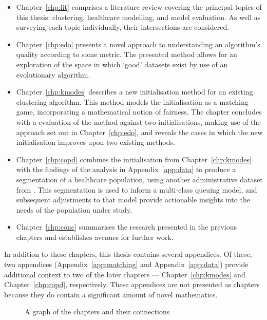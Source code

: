 \begin{itemize}
    \item Chapter~\ref{chp:lit} comprises a literature review covering the
        principal topics of this thesis: clustering, healthcare modelling, and
        model evaluation. As well as surveying each topic individually, their
        intersections are considered.
    \item Chapter~\ref{chp:edo} presents a novel approach to understanding an
        algorithm's quality according to some metric. The presented method
        allows for an exploration of the space in which `good' datasets exist
        by use of an evolutionary algorithm.
    \item Chapter~\ref{chp:kmodes} describes a new initialisation method for an
        existing clustering algorithm. This method models the initialisation as
        a matching game, incorporating a mathematical notion of fairness. The
        chapter concludes with a evaluation of the method against two
        initialisations, making use of the approach set out in
        Chapter~\ref{chp:edo}, and reveals the cases in which the new
        initialisation improves upon two existing methods.
    \item Chapter~\ref{chp:copd} combines the initialisation from
        Chapter~\ref{chp:kmodes} with the findings of the analysis in
        Appendix~\ref{app:data} to produce a segmentation of a healthcare
        population, using another administrative dataset from \ctmuhb. This
        segmentation is used to inform a multi-class queuing model, and
        subsequent adjustments to that model provide actionable insights into
        the needs of the population under study.
    \item Chapter~\ref{chp:conc} summarises the research presented in the
        previous chapters and establishes avenues for further work.
\end{itemize}

In addition to these chapters, this thesis contains several appendices. Of
these, two appendices (Appendix~\ref{app:matching} and Appendix~\ref{app:data})
provide additional context to two of the later chapters ---
Chapter~\ref{chp:kmodes} and Chapter~\ref{chp:copd}, respectively. These
appendices are not presented as chapters because they do contain a significant
amount of novel mathematics.

\begin{figure}[htbp]
    \centering%
    \resizebox{\imgwidth}{!}{%
    
    }
    \caption{A graph of the chapters and their connections}\label{fig:structure}
\end{figure}

